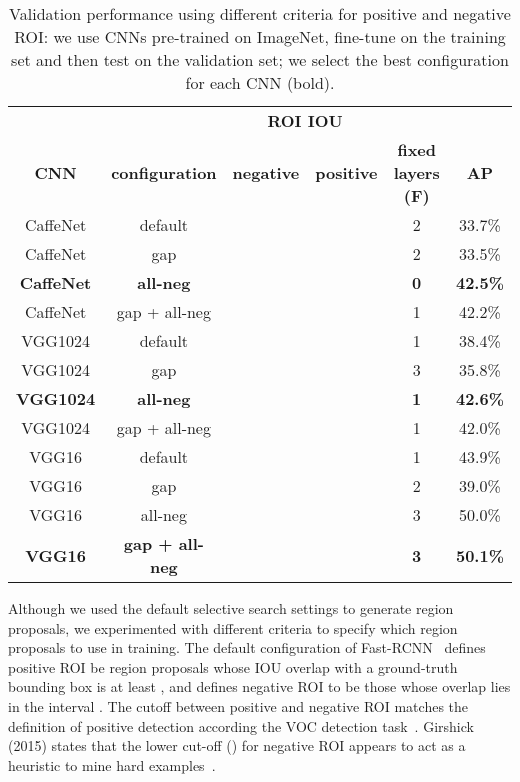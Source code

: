 \documentclass[runningheads]{llncs}
\begin{document}
\begin{table}[b!]
\begin{center}
\caption{Validation performance using different criteria for positive and negative \ac{ROI}: we use CNNs pre-trained on ImageNet, fine-tune on the training set and then test on the validation set; we select the best configuration for each \ac{CNN} (bold). \label{tbl:ROISelection}}
\begin{tabular}{cccccc}
  \hline
  & & \multicolumn{2}{c}{\textbf{\ac{ROI} \ac{IOU}}} \\
  \cline{3-4}
  \textbf{CNN} & \textbf{configuration} & \textbf{negative} & \textbf{positive} &
  \textbf{fixed layers (F)} & \textbf{AP} \\
 \hline
  CaffeNet & default & &  & 2 & 33.7\% \\
  CaffeNet & gap & &  & 2 & 33.5\% \\
\textbf{  CaffeNet } & \textbf{ all-neg } &   &    & \textbf{ 0 } & \textbf{ 42.5\%} \\
  CaffeNet & gap + all-neg & &  & 1 & 42.2\% \\
\hline
  VGG1024 & default & &  & 1 & 38.4\% \\
  VGG1024 & gap & &  & 3 & 35.8\% \\
\textbf{  VGG1024 } & \textbf{ all-neg } &   &    & \textbf{ 1 } & \textbf{ 42.6\%} \\
  VGG1024 & gap + all-neg & &  & 1 & 42.0\% \\
\hline
  VGG16 & default & &  & 1 & 43.9\% \\
  VGG16 & gap & &  & 2 & 39.0\% \\
  VGG16 & all-neg & &  & 3 & 50.0\% \\
\textbf{  VGG16 } & \textbf{ gap + all-neg } &   &    & \textbf{ 3 } & \textbf{ 50.1\%} \\
\hline
\end{tabular} \end{center}
\end{table}


Although we used the default selective search settings to generate region proposals, we experimented with different criteria to specify which region proposals to use in training.
The default configuration of Fast-RCNN~\cite{girshick2015fast} defines positive \ac{ROI} be region proposals whose \ac{IOU} overlap with a ground-truth bounding box is at least
,
 and defines negative \ac{ROI} to be those whose overlap lies in the interval 
.
The cutoff between positive and negative \ac{ROI} matches the definition of positive detection according the \ac{VOC} detection task~\cite{everingham2007pascal}.
Girshick (2015) states that the lower cut-off 
()
for negative \ac{ROI} appears to act as a heuristic to mine hard examples~\cite{girshick2015fast,felzenszwalb2010object}.
\end{document}
